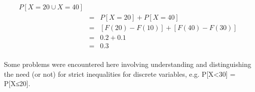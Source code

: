 \documentclass[a4paper,12pt]{article}
\begin{document}
\begin{eqnarray*}
P \left[ { X =20 } ∪ { X  = 40 } \right] \\ &=& P [ X =20 ] + P [ X = 40 ]
\\ &=& \left[ F ( 20 ) − F ( 10 ) \right] + \left[ F ( 40 ) − F ( 30 ) \right] \\ &=& 0.2 + 0.1 \\ &=& 0.3\\
\end{eqnarray*}

Some problems were encountered here involving understanding and distinguishing the need
(or not) for strict inequalities for discrete variables, e.g. P[X<30] = P[X≤20].
\end{document}
